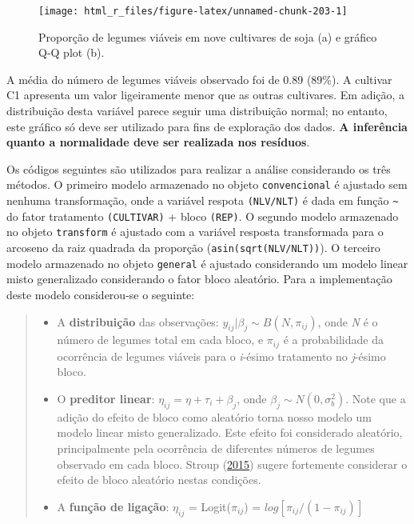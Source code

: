 \documentclass[
]{book}
\numberwithin{equation}{section}
\begin{document}
\begin{figure}

{\centering \texttt{[image: html\_r\_files/figure-latex/unnamed-chunk-203-1]} 

}

\caption{Proporção de legumes viáveis em nove cultivares de soja (a) e gráfico Q-Q plot (b).}\label{fig:unnamed-chunk-203}
\end{figure}

A média do número de legumes viáveis observado foi de 0.89 (89\%). A cultivar C1 apresenta um valor ligeiramente menor que as outras cultivares. Em adição, a distribuição desta variável parece seguir uma distribuição normal; no entanto, este gráfico só deve ser utilizado para fins de exploração dos dados. \textbf{A inferência quanto a normalidade deve ser realizada nos resíduos}.

Os códigos seguintes são utilizados para realizar a análise considerando os três métodos. O primeiro modelo armazenado no objeto \texttt{convencional} é ajustado sem nenhuma transformação, onde a variável respota \texttt{(NLV/NLT)} é dada em função \texttt{\textasciitilde{}} do fator tratamento \texttt{(CULTIVAR)} + bloco \texttt{(REP)}. O segundo modelo armazenado no objeto \texttt{transform} é ajustado com a variável resposta transformada para o arcoseno da raiz quadrada da proporção (\texttt{asin(sqrt(NLV/NLT))}). O terceiro modelo armazenado no objeto \texttt{general} é ajustado considerando um modelo linear misto generalizado considerando o fator bloco aleatório. Para a implementação deste modelo considerou-se o seguinte:

\begin{quote}
\begin{itemize}
\item
  A \textbf{distribuição} das observações: \(y_{ij}|\beta_j \sim B(N, \pi_{ij})\), onde \emph{N} é o número de legumes total em cada bloco, e \(\pi_{ij}\) é a probabilidade da ocorrência de legumes viáveis para o \emph{i}-ésimo tratamento no \emph{j}-ésimo bloco.
\item
  O \textbf{preditor linear}: \(\eta_{ij} = \eta + \tau_{i} + \beta_j\), onde \(\beta_j \sim N(0, \sigma^2_b)\). Note que a adição do efeito de bloco como aleatório torna nosso modelo um modelo linear misto generalizado. Este efeito foi considerado aleatório, principalmente pela ocorrência de diferentes números de legumes observado em cada bloco. Stroup (\protect\hyperlink{ref-Stroup2015}{2015}) sugere fortemente considerar o efeito de bloco aleatório nestas condições.
\item
  A \textbf{função de ligação}: \(\eta_{ij}\) = Logit(\(\pi_{ij}\)) = \(log[\pi_{ij}/(1-\pi_{ij})]\)
\end{itemize}
\end{quote}
\end{document}
